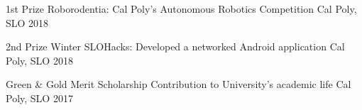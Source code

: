 



\begin{cvhonors}

  \cvhonor
    {1st Prize} %
    {Roborodentia: Cal Poly's Autonomous Robotics Competition} %
    {Cal Poly, SLO} %
    {2018} %

  \cvhonor
    {2nd Prize} %
    {Winter SLOHacks: Developed a networked Android application} %
    {Cal Poly, SLO} %
    {2018} %

\end{cvhonors}




\begin{cvhonors}

  \cvhonor
    {Green \& Gold Merit Scholarship} %
    {Contribution to University's academic life} %
    {Cal Poly, SLO} %
    {2017} %



\end{cvhonors}
